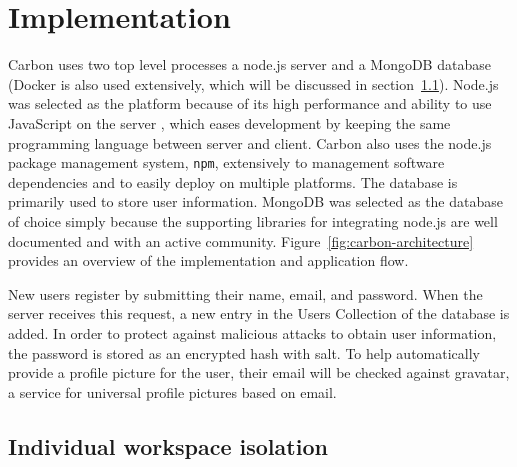 \autocite{ragan2013collaborative}

\section{Implementation}

Carbon uses two top level processes a node.js server and a MongoDB database (Docker is also used extensively, which will be discussed in section~\ref{sec:docker}).
Node.js was selected as the platform because of its high performance and ability to use JavaScript on the server \autocite{tilkov2010node}, which eases development by keeping the same programming language between server and client.
Carbon also uses the node.js package management system, \texttt{npm}, extensively to management software dependencies and to easily deploy on multiple platforms. \autocite{lerner2011forge}
The database is primarily used to store user information.
MongoDB was selected as the database of choice simply because the supporting libraries for integrating node.js are well documented and with an active community.
Figure~\ref{fig:carbon-architecture} provides an overview of the implementation and application flow.

New users register by submitting their name, email, and password.
When the server receives this request, a new entry in the Users Collection of the database is added.
In order to protect against malicious attacks to obtain user information, the password is stored as an encrypted hash with salt. \autocite{bellovin1993augmented}
To help automatically provide a profile picture for the user, their email will be checked against gravatar, a service for universal profile pictures based on email.

\subsection{Individual workspace isolation}
\label{sec:docker}

